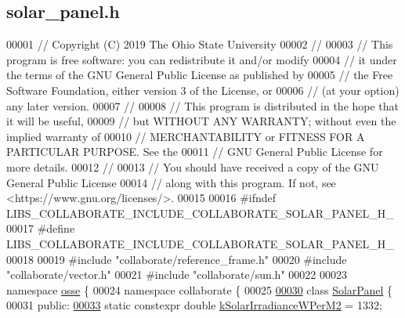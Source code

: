 \hypertarget{solar__panel_8h_source}{}\subsection{solar\+\_\+panel.\+h}
\label{solar__panel_8h_source}

\begin{DoxyCode}
00001 \textcolor{comment}{// Copyright (C) 2019 The Ohio State University}
00002 \textcolor{comment}{//}
00003 \textcolor{comment}{// This program is free software: you can redistribute it and/or modify}
00004 \textcolor{comment}{// it under the terms of the GNU General Public License as published by}
00005 \textcolor{comment}{// the Free Software Foundation, either version 3 of the License, or}
00006 \textcolor{comment}{// (at your option) any later version.}
00007 \textcolor{comment}{//}
00008 \textcolor{comment}{// This program is distributed in the hope that it will be useful,}
00009 \textcolor{comment}{// but WITHOUT ANY WARRANTY; without even the implied warranty of}
00010 \textcolor{comment}{// MERCHANTABILITY or FITNESS FOR A PARTICULAR PURPOSE.  See the}
00011 \textcolor{comment}{// GNU General Public License for more details.}
00012 \textcolor{comment}{//}
00013 \textcolor{comment}{// You should have received a copy of the GNU General Public License}
00014 \textcolor{comment}{// along with this program.  If not, see <https://www.gnu.org/licenses/>.}
00015 
00016 \textcolor{preprocessor}{#ifndef LIBS\_COLLABORATE\_INCLUDE\_COLLABORATE\_SOLAR\_PANEL\_H\_}
00017 \textcolor{preprocessor}{#define LIBS\_COLLABORATE\_INCLUDE\_COLLABORATE\_SOLAR\_PANEL\_H\_}
00018 
00019 \textcolor{preprocessor}{#include "collaborate/reference\_frame.h"}
00020 \textcolor{preprocessor}{#include "collaborate/vector.h"}
00021 \textcolor{preprocessor}{#include "collaborate/sun.h"}
00022 
00023 \textcolor{keyword}{namespace }\hyperlink{namespaceosse}{osse} \{
00024 \textcolor{keyword}{namespace }collaborate \{
00025 
\hyperlink{classosse_1_1collaborate_1_1_solar_panel}{00030} \textcolor{keyword}{class }\hyperlink{classosse_1_1collaborate_1_1_solar_panel}{SolarPanel} \{
00031  \textcolor{keyword}{public}:
\hyperlink{classosse_1_1collaborate_1_1_solar_panel_a955f766fe850b04209aa6878473dbd5e}{00033}   \textcolor{keyword}{static} constexpr \textcolor{keywordtype}{double} \hyperlink{classosse_1_1collaborate_1_1_solar_panel_a955f766fe850b04209aa6878473dbd5e}{kSolarIrradianceWPerM2} = 1332;

\end{DoxyCode}
